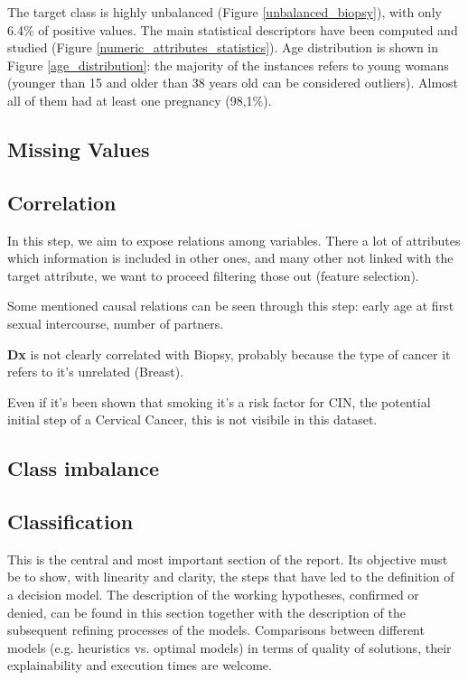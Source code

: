 The target class is highly unbalanced (Figure \ref{unbalanced_biopsy}), with only 6.4\% of positive values.
The main statistical descriptors have been computed and studied (Figure \ref{numeric_attributes_statistics}). Age distribution is shown in Figure \ref{age_distribution}: the majority of the instances refers to young womans (younger than 15 and older than 38 years old can be considered outliers). Almost all of them had at least one pregnancy (98,1\%).
\subsection{Missing Values}


\subsection{Correlation}

In this step, we aim to expose relations among variables. There a lot of attributes which information is included in other ones, and many other not linked with the target attribute, we want to proceed filtering those out (feature selection).

Some mentioned causal relations can be seen through this step: early age at first sexual intercourse, number of partners.

\textbf{Dx} is not clearly correlated with Biopsy, probably because the type of cancer it refers to it's unrelated (Breast).

Even if it's been shown that smoking it's a risk factor for CIN, the potential initial step of a Cervical Cancer, this is not visibile in this dataset.


\subsection{Class imbalance}
\subsection{Classification}

This is the central and most important section of the report. Its objective must be to show, with linearity and clarity, the steps that have led to the definition of a decision model. The description of the working hypotheses, confirmed or denied, can be found in this section together with the description of the subsequent refining processes of the models. Comparisons between different models (e.g. heuristics vs. optimal models) in terms of quality of solutions, their explainability and execution times are welcome. 

